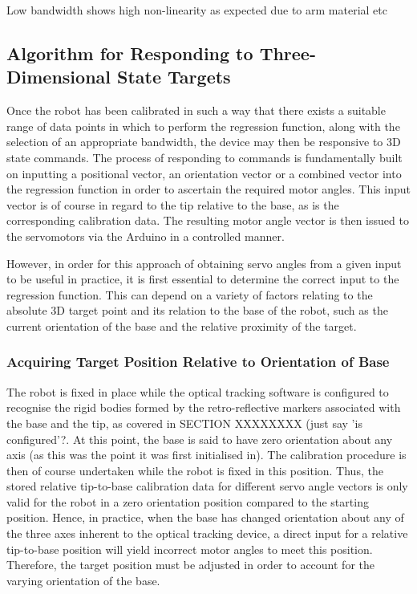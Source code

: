 \documentclass[11pt]{article}
\begin{document}
Low bandwidth shows high non-linearity as expected due to arm material etc




\pagebreak 
\subsection{Algorithm for Responding to Three-Dimensional State Targets}
Once the robot has been calibrated in such a way that there exists a suitable range of data points in which to perform the regression function, along with the selection of an appropriate bandwidth, the device may then be responsive to 3D state commands.
The process of responding to commands is fundamentally built on inputting a positional vector, an orientation vector or a combined vector into the regression function in order to ascertain the required motor angles. This input vector is of course in regard to the tip relative to the base, as is the corresponding calibration data. The resulting motor angle vector is then issued to the servomotors via the Arduino in a controlled manner. 

However, in order for this approach of obtaining servo angles from a given input to be useful in practice, it is first essential to determine the correct input to the regression function. This can depend on a variety of factors relating to the absolute 3D target point and its relation to the base of the robot, such as the current orientation of the base and the relative proximity of the target.

\subsubsection{Acquiring Target Position Relative to Orientation of Base}
The robot is fixed in place while the optical tracking software is configured to recognise the rigid bodies formed by the retro-reflective markers associated with the base and the tip, as covered in SECTION XXXXXXXX (just say 'is configured'?. At this point, the base is said to have zero orientation about any axis (as this was the point it was first initialised in). The calibration procedure is then of course undertaken while the robot is fixed in this position. Thus, the stored relative tip-to-base calibration data for different servo angle vectors is only valid for the robot in a zero orientation position compared to the starting position. Hence, in practice, when the base has changed orientation about any of the three axes inherent to the optical tracking device, a direct input for a relative tip-to-base position will yield incorrect motor angles to meet this position. Therefore, the target position must be adjusted in order to account for the varying orientation of the base.
\end{document}

